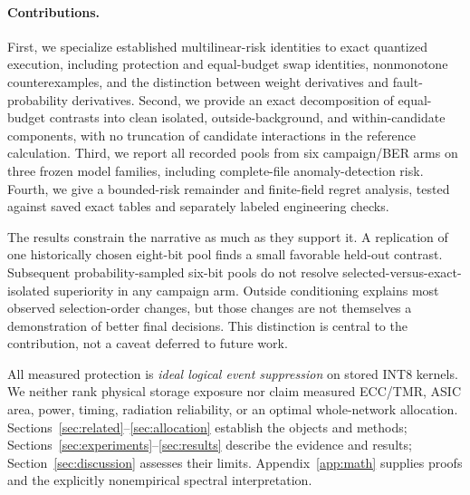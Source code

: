 \paragraph{Contributions.}
First, we specialize established multilinear-risk identities to exact quantized execution, including protection and equal-budget swap identities, nonmonotone counterexamples, and the distinction between weight derivatives and fault-probability derivatives. Second, we provide an exact decomposition of equal-budget contrasts into clean isolated, outside-background, and within-candidate components, with no truncation of candidate interactions in the reference calculation. Third, we report all recorded pools from six campaign/BER arms on three frozen model families, including complete-file anomaly-detection risk. Fourth, we give a bounded-risk remainder and finite-field regret analysis, tested against saved exact tables and separately labeled engineering checks.

The results constrain the narrative as much as they support it. A replication of one historically chosen eight-bit pool finds a small favorable held-out contrast. Subsequent probability-sampled six-bit pools do not resolve selected-versus-exact-isolated superiority in any campaign arm. Outside conditioning explains most observed selection-order changes, but those changes are not themselves a demonstration of better final decisions. This distinction is central to the contribution, not a caveat deferred to future work.

All measured protection is \emph{ideal logical event suppression} on stored INT8 kernels. We neither rank physical storage exposure nor claim measured ECC/TMR, ASIC area, power, timing, radiation reliability, or an optimal whole-network allocation. Sections~\ref{sec:related}--\ref{sec:allocation} establish the objects and methods; Sections~\ref{sec:experiments}--\ref{sec:results} describe the evidence and results; Section~\ref{sec:discussion} assesses their limits. Appendix~\ref{app:math} supplies proofs and the explicitly nonempirical spectral interpretation.

